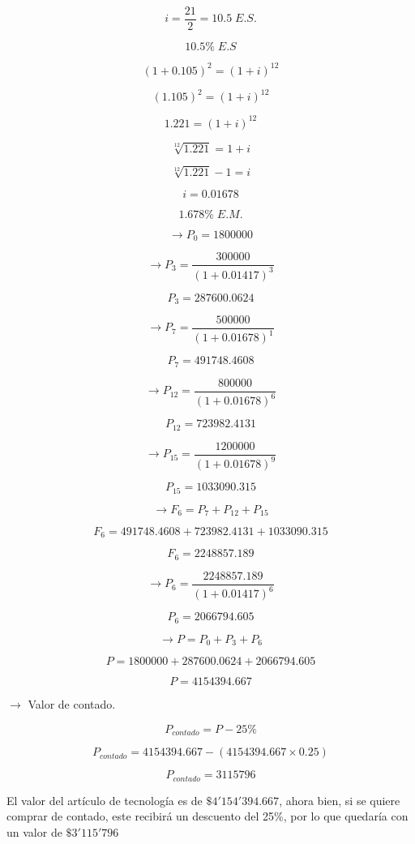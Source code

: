\documentclass[12pt, letterpaper, twoside]{article}
\begin{document}
\[ i = \frac{21}{2} = 10.5 \; E.S. \]

\[ 10.5\% \; E.S \]

\[ (1 + 0.105)^2 = (1 + i)^{12} \]

\[ (1.105)^2 = (1 + i)^{12} \]

\[ 1.221 = (1 + i)^{12} \]

\[ \sqrt[12]{1.221} = 1 + i \]

\[ \sqrt[12]{1.221} - 1 = i \]

\[ i = 0.01678 \]

\[ 1.678\% \; E.M. \]

\[ \rightarrow P_0 = 1800000 \]

\[ \rightarrow P_3 = \frac{300000}{(1 + 0.01417)^3} \]

\[ P_3 = 287600.0624 \]

\[ \rightarrow P_7 = \frac{500000}{(1 + 0.01678)^1} \]

\[ P_7 = 491748.4608 \]

\[ \rightarrow P_{12} = \frac{800000}{(1 + 0.01678)^6} \]

\[ P_{12} = 723982.4131 \]

\[ \rightarrow P_{15} = \frac{1200000}{(1 + 0.01678)^9} \]

\[ P_{15} = 1033090.315 \]

\[ \rightarrow F_6 = P_7 + P_{12} + P_{15} \]

\[ F_6 = 491748.4608 + 723982.4131 + 1033090.315 \]

\[ F_6 = 2248857.189 \]

\[ \rightarrow P_6 = \frac{2248857.189}{(1 + 0.01417)^6} \]

\[ P_6 = 2066794.605\]

\[ \rightarrow P = P_0 + P_3 + P_6 \]

\[ P = 1800000 + 287600.0624 + 2066794.605\]

\[ P = 4154394.667\]

\(\rightarrow \) Valor de contado.

\[ P_{contado} = P - 25\% \]

\[ P_{contado} = 4154394.667 - (4154394.667 \times 0.25) \]

\[ P_{contado} = 3115796 \]

El valor del artículo de tecnología es de \(\$4'154'394.667\), ahora bien, si se quiere
comprar de contado, este recibirá un descuento del 25\%, por lo que quedaría con un valor
de \(\$3'115'796\) 
\end{document}
